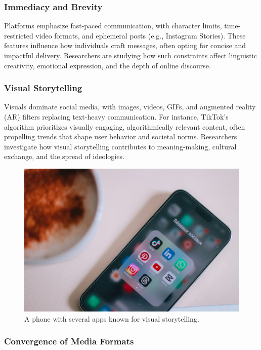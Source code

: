 \documentclass[
]{book}
\begin{document}
\subsubsection{Immediacy and Brevity}\label{immediacy-and-brevity}

Platforms emphasize fast-paced communication, with character limits, time-restricted video formats, and ephemeral posts (e.g., Instagram Stories). These features influence how individuals craft messages, often opting for concise and impactful delivery. Researchers are studying how such constraints affect linguistic creativity, emotional expression, and the depth of online discourse.

\subsubsection{Visual Storytelling}\label{visual-storytelling}

Visuals dominate social media, with images, videos, GIFs, and augmented reality (AR) filters replacing text-heavy communication. For instance, TikTok's algorithm prioritizes visually engaging, algorithmically relevant content, often propelling trends that shape user behavior and societal norms. Researchers investigate how visual storytelling contributes to meaning-making, cultural exchange, and the spread of ideologies.

\begin{figure}
\centering
\includegraphics[width=1\textwidth,height=\textheight]{images/visual-story.jpg}
\caption{A phone with several apps known for visual storytelling.}
\end{figure}

\subsubsection{Convergence of Media Formats}\label{convergence-of-media-formats}
\end{document}

